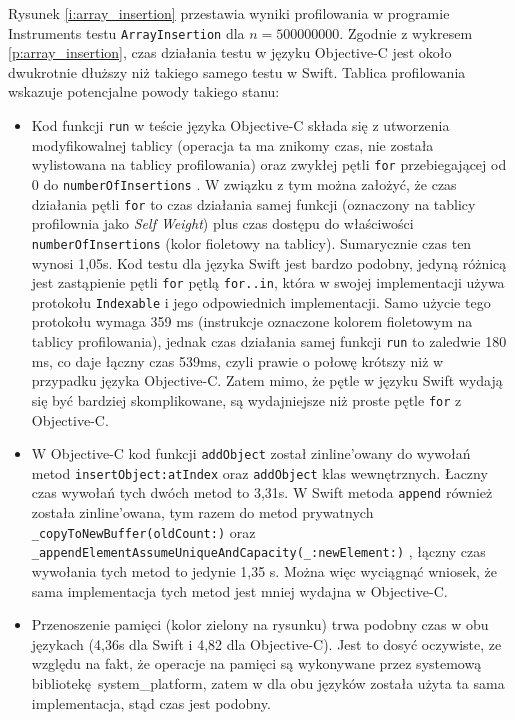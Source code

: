 \documentclass[mgr, shortabstract]{iithesis}
\newcommand{\swiftinline}[1]{
    \texttt{#1}
}
\newcommand{\objcinline}[1]{
    \texttt{#1}
}
\begin{document}
Rysunek \ref{i:array_insertion} przestawia wyniki profilowania w programie Instruments testu \texttt{ArrayInsertion} dla $n = 500000000$. Zgodnie z wykresem \ref{p:array_insertion}, czas działania testu w języku Objective-C jest około dwukrotnie dłuższy niż takiego samego testu w Swift. Tablica profilowania wskazuje potencjalne powody takiego stanu:

\begin{itemize}
    \item Kod funkcji \objcinline{run} w teście języka Objective-C składa się z utworzenia modyfikowalnej tablicy (operacja ta ma znikomy czas, nie została wylistowana na tablicy profilowania) oraz zwykłej pętli \texttt{for} przebiegającej od 0 do \objcinline{numberOfInsertions}. W związku z tym można założyć, że czas działania pętli \texttt{for} to czas działania samej funkcji (oznaczony na tablicy profilownia jako \textit{Self Weight}) plus czas dostępu do właściwości \objcinline{numberOfInsertions} (kolor fioletowy na tablicy). Sumarycznie czas ten wynosi 1,05s. Kod testu dla języka Swift jest bardzo podobny, jedyną różnicą jest zastąpienie pętli \texttt{for} pętlą \texttt{for..in}, która w swojej implementacji używa protokołu \swiftinline{Indexable} i jego odpowiednich implementacji. Samo użycie tego protokołu wymaga 359 ms (instrukcje oznaczone kolorem fioletowym na tablicy profilowania), jednak czas działania samej funkcji \swiftinline{run} to zaledwie 180 ms, co daje łączny czas 539ms, czyli prawie o połowę krótszy niż w przypadku języka Objective-C. Zatem mimo, że pętle w języku Swift wydają się być bardziej skomplikowane, są wydajniejsze niż proste pętle \texttt{for} z Objective-C.
    \item W Objective-C kod funkcji \objcinline{addObject} został zinline'owany do wywołań metod \objcinline{insertObject:atIndex} oraz \objcinline{addObject} klas wewnętrznych. Łaczny czas wywołań tych dwóch metod to 3,31s. W Swift metoda \swiftinline{append} również została zinline'owana, tym razem do metod prywatnych \swiftinline{_copyToNewBuffer(oldCount:)} oraz \swiftinline{_appendElementAssumeUniqueAndCapacity(_:newElement:)}, łączny czas wywołania tych metod to jedynie 1,35 s. Można więc wyciągnąć wniosek, że sama implementacja tych metod jest mniej wydajna w Objective-C.
    \item Przenoszenie pamięci (kolor zielony na rysunku) trwa podobny czas w obu językach (4,36s dla Swift i 4,82 dla Objective-C). Jest to dosyć oczywiste, ze względu na fakt, że operacje na pamięci są wykonywane przez systemową bibliotekę \textsf{system\_platform}, zatem w dla obu języków została użyta ta sama implementacja, stąd czas jest podobny.

\end{itemize}
\end{document}
